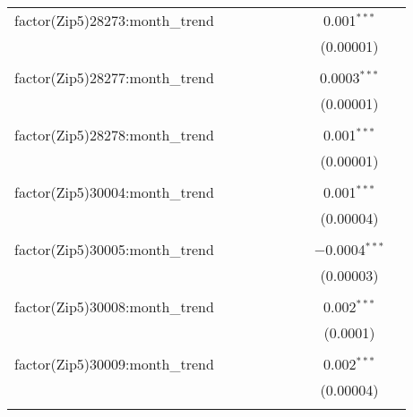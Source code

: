 \begin{table}[H]
{\begin{tabular}{@{\extracolsep{5pt}}lcccccccc}
  factor(Zip5)28273:month\_trend &  &  &  &  &  &  & 0.001$^{***}$ &  \\  

   &  &  &  &  &  &  & (0.00001) &  \\  

   & & & & & & & & \\  

  factor(Zip5)28277:month\_trend &  &  &  &  &  &  & 0.0003$^{***}$ &  \\  

   &  &  &  &  &  &  & (0.00001) &  \\  

   & & & & & & & & \\  

  factor(Zip5)28278:month\_trend &  &  &  &  &  &  & 0.001$^{***}$ &  \\  

   &  &  &  &  &  &  & (0.00001) &  \\  

   & & & & & & & & \\  

  factor(Zip5)30004:month\_trend &  &  &  &  &  &  & 0.001$^{***}$ &  \\  

   &  &  &  &  &  &  & (0.00004) &  \\  

   & & & & & & & & \\  

  factor(Zip5)30005:month\_trend &  &  &  &  &  &  & $-$0.0004$^{***}$ &  \\  

   &  &  &  &  &  &  & (0.00003) &  \\  

   & & & & & & & & \\  

  factor(Zip5)30008:month\_trend &  &  &  &  &  &  & 0.002$^{***}$ &  \\  

   &  &  &  &  &  &  & (0.0001) &  \\  

   & & & & & & & & \\  

  factor(Zip5)30009:month\_trend &  &  &  &  &  &  & 0.002$^{***}$ &  \\  

   &  &  &  &  &  &  & (0.00004) &  \\  

   & & & & & & & & \\  


\end{tabular}}
\end{table}
